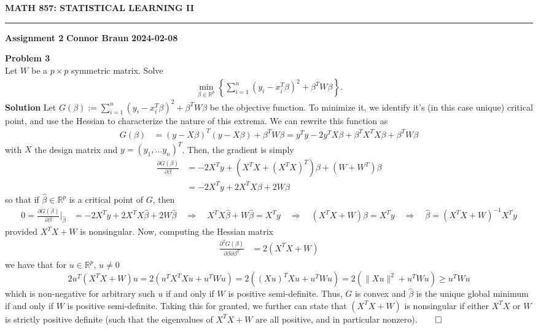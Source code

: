 \documentclass[10pt]{article}
\newcommand{\mbb}[1]{\mathbb{#1}}
\newcommand{\1}[1]{\mathbbm{1}_{#1}}
\begin{document}
    \begin{center}
        {\bf\large{MATH 857: STATISTICAL LEARNING II}}
        \smallskip
        \hrule
        \smallskip
        {\bf Assignment 2} \hfill {\bf Connor Braun} \hfill {\bf 2024-02-08}
    \end{center}
    {\bf Problem 3}\\[5pt]
    Let $W$ be a $p\times p$ symmetric matrix. Solve
    \begin{align*}
        \min_{\beta\in\mbb{R}^p}\left\{\sum_{i=1}^n(y_i-x_i^T\beta)^2+\beta^TW\beta\right\}.
    \end{align*}
    {\bf Solution}\hspace{5pt} Let $G(\beta):=\sum_{i=1}^n(y_i-x_i^T\beta)^2+\beta^TW\beta$ be the objective function. To minimize it, we identify it's (in this case unique) critical point, and use the Hessian to characterize the nature of this extrema. We can rewrite this function as 
    \begin{align*}
        G(\beta)&=(y-X\beta)^T(y-X\beta)+\beta^T W\beta=y^Ty-2y^TX\beta+\beta^TX^TX\beta+\beta^TW\beta
    \end{align*}
    with $X$ the design matrix and $y=(y_1,\dots y_n)^T$. Then, the gradient is simply
    \begin{align*}
        \frac{\partial G(\beta)}{\partial \beta}&=-2X^Ty+(X^TX+(X^TX)^T)\beta+(W+W^T)\beta\tag{by the previous problem}\\
        &=-2X^Ty+2X^TX\beta+2W\beta\tag{since $W^T=W$}
    \end{align*}
    so that if $\hat{\beta}\in\mbb{R}^p$ is a critical point of $G$, then
    \begin{align*}
        0=\frac{\partial G(\beta)}{\partial\beta}\bigg|_{\hat{\beta}}&=-2X^Ty+2X^TX\hat{\beta}+2W\hat{\beta}\quad\Rightarrow\quad X^TX\hat{\beta}+W\hat{\beta}=X^Ty\quad\Rightarrow\quad(X^TX+W)\hat{\beta}=X^Ty\quad\Rightarrow\quad\hat{\beta}=(X^TX+W)^{-1}X^Ty
    \end{align*}
    provided $X^TX+W$ is nonsingular. Now, computing the Hessian matrix
    \begin{align*}
        \frac{\partial^2G(\beta)}{\partial\beta\partial\beta^T}&=2(X^TX+W)
    \end{align*}
    we have that for $u\in\mbb{R}^p$, $u\neq 0$
    \[2u^T(X^TX+W)u=2(u^TX^TXu+u^TWu)=2((Xu)^TXu+u^TWu)=2(\|Xu\|^2+u^TWu)\geq u^TWu\]
    which is non-negative for arbitrary such $u$ if and only if $W$ is positive semi-definite. Thus, $G$ is convex and $\hat{\beta}$ is the unique global minimum if and only if $W$ is positive semi-definite.
    Taking this for granted, we further can state that $(X^TX+W)$ is nonsingular if either $X^TX$ or $W$ is strictly positive definite (such that the eigenvalues of $X^TX+W$ are all positive, and in particular nonzero).\hfill{$\qed$}\\[5pt]
\end{document}
